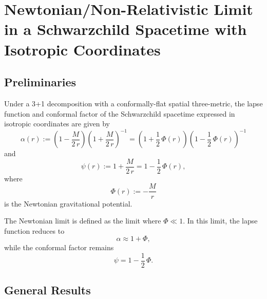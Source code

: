 \newcommand{\normv}{\left|\left|\myol{v}\right|\right|}
\newcommand{\TF}{T_{\mathrm{F}}}
\newcommand{\LF}{L_{\mathrm{F}}}
\newcommand{\LG}{L_{\mathrm{G}}}
\newcommand{\hNR}{h_{\mathrm{NR}}}
\section{Newtonian/Non-Relativistic Limit in a Schwarzchild Spacetime
with Isotropic Coordinates}

\subsection{Preliminaries}

Under a 3+1 decomposition with a conformally-flat spatial three-metric,
the lapse function and conformal factor of the Schwarzchild spacetime expressed
in isotropic coordinates are given by \citep{bs2010}
\begin{equation}
  \alpha\left(r\right)
  :=\left(1-\frac{M}{2\,r}\right)
    \left(1+\frac{M}{2\,r}\right)^{-1}
  =\left(1+\frac{1}{2}\,\Phi\left(r\right)\right)
   \left(1-\frac{1}{2}\,\Phi\left(r\right)\right)^{-1}
\end{equation}
and
\begin{equation}
  \psi\left(r\right)
  :=1+\frac{M}{2\,r}
  =1-\frac{1}{2}\,\Phi\left(r\right),
  \label{eq.cf}
\end{equation}
where
\begin{equation}
  \Phi\left(r\right)
  :=-\frac{M}{r}
\end{equation}
is the Newtonian gravitational potential.\vspace{1em}

The Newtonian limit is defined as the limit where $\Phi\ll1$.
In this limit, the lapse function reduces to
\begin{equation}
  \alpha\approx1+\Phi,
\end{equation}
while the conformal factor remains
\begin{equation}
  \psi=1-\frac{1}{2}\,\Phi.
\end{equation}

\subsection{General Results}

